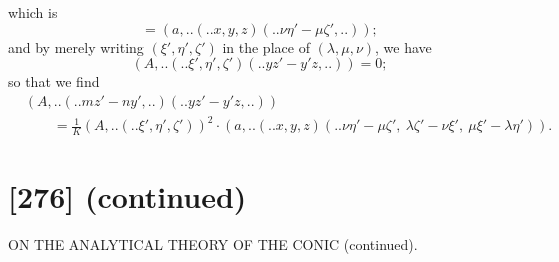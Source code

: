 \documentclass[12pt,a4paper]{article}
\newcommand{\qform}[2]{(#1 \mathbin{..} #2)}
\theoremstyle{definition}
\begin{document}
which is
\[
= (a,..\!\qform{}{x, y, z}\!\qform{}{\nu\eta' - \mu\zeta',..});
\]
and by merely writing $(\xi', \eta', \zeta')$ in the place of $(\lambda, \mu, \nu)$, we have
\[
(A,..\!\qform{}{\xi', \eta', \zeta'}\!\qform{}{yz' - y'z,..}) = 0;
\]
so that we find
\begin{align*}
&(A,..\!\qform{}{mz' - ny',..}\!\qform{}{yz' - y'z,..})\\
&\qquad = \frac{1}{K}(A,..\!\qform{}{\xi', \eta', \zeta'})^{2} \cdot (a,..\!\qform{}{x, y, z}\!\qform{}{\nu\eta' - \mu\zeta',\ \lambda\zeta' - \nu\xi',\ \mu\xi' - \lambda\eta'}).
\end{align*}

\newpage
\section*{[276] (continued)}
\begin{center}
{\large ON THE ANALYTICAL THEORY OF THE CONIC (continued).}
\end{center}
\end{document}

